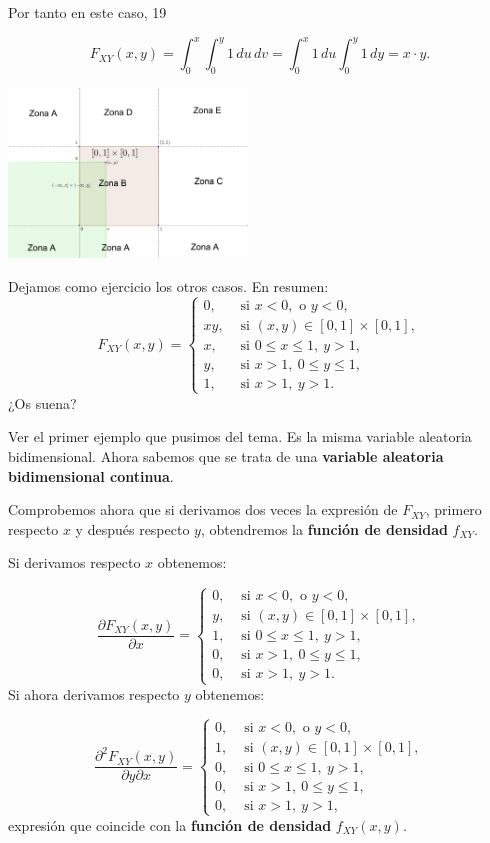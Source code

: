 \documentclass[
  letterpaper,
  DIV=11,
  numbers=noendperiod]{scrreprt}
\begin{document}
Por tanto en este caso, 19

\[
F_{XY}(x,y)=\int_0^x \int_0^y 1\,du\,dv =\int_0^x 1\, du\int_0^y 1\, dy =x\cdot y.
\]

\includegraphics[width=2.5in,height=\textheight]{Images/VaUniformeBidi4.png}

Dejamos como ejercicio los otros casos. En resumen: \[
F_{XY}(x,y)=\begin{cases}
0, & \mbox{ si }x<0, \mbox{ o }y<0,\\
x y, & \mbox{ si }(x,y)\in [0,1]\times [0,1],\\
x, & \mbox{ si }0\leq x\leq 1,\ y>1,\\
y, & \mbox{ si }x>1,\ 0\leq y\leq 1,\\
1, & \mbox{ si } x>1,\ y>1.
\end{cases}
\] ¿Os suena?

Ver el primer ejemplo que pusimos del tema. Es la misma variable
aleatoria bidimensional. Ahora sabemos que se trata de una
\textbf{variable aleatoria bidimensional continua}.

Comprobemos ahora que si derivamos dos veces la expresión de \(F_{XY}\),
primero respecto \(x\) y después respecto \(y\), obtendremos la
\textbf{función de densidad} \(f_{XY}\).

Si derivamos respecto \(x\) obtenemos:

\[
\frac{\partial F_{XY}(x,y)}{\partial x}=\begin{cases}
0, & \mbox{ si }x<0, \mbox{ o }y<0,\\
y, & \mbox{ si }(x,y)\in [0,1]\times [0,1],\\
1, & \mbox{ si }0\leq x\leq 1,\ y>1,\\
0, & \mbox{ si }x>1,\ 0\leq y\leq 1,\\
0, & \mbox{ si } x>1,\ y>1.
\end{cases}
\] Si ahora derivamos respecto \(y\) obtenemos:

\[
\frac{\partial^2 F_{XY}(x,y)}{\partial y\partial x}=\begin{cases}
0, & \mbox{ si }x<0, \mbox{ o }y<0,\\
1, & \mbox{ si }(x,y)\in [0,1]\times [0,1],\\
0, & \mbox{ si }0\leq x\leq 1,\ y>1,\\
0, & \mbox{ si }x>1,\ 0\leq y\leq 1,\\
0, & \mbox{ si } x>1,\ y>1,
\end{cases}
\] expresión que coincide con la \textbf{función de densidad}
\(f_{XY}(x,y)\).
\end{document}
